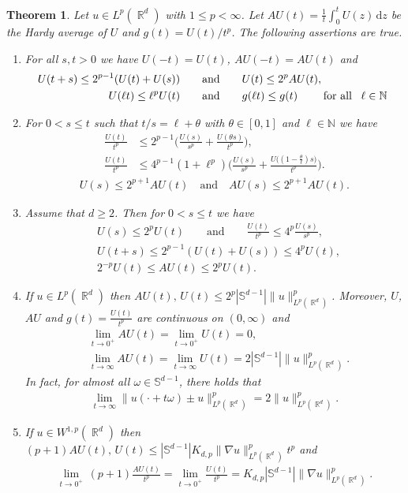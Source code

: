 \documentclass[12pt, reqno]{amsart}%
\theoremstyle{plain}  %
\newtheorem{theorem}{Theorem}[section]
\theoremstyle{definition}  %
\theoremstyle{remark}
\numberwithin{equation}{section}
\DeclareMathOperator{\R}{\mathbb{R}}
\renewcommand{\d}{\,\mathrm{d}}
\begin{document}
\begin{theorem}\label{thm:lp-first-order-diff}
Let $u\in L^p(\R^d)$ with $1\leq p<\infty$. Let  $AU(t)=\frac{1}{t}\int_0^t U(z)\d z$  be the  Hardy average of $U$ and $g(t)= U(t)/t^p$.
The following assertions are true.
\begin{enumerate}
\item \label{itme:lp-diff1}   For all $s, t>0$ we have $U(-t)=U(t)$, $AU(-t)= AU(t)$ and
\begin{align*}
U(t+s)\leq2^{p-1} ( U(t)+U(s))&\qquad\text{and}\qquad U(t)\leq 2^p AU(t), \\
U(\ell t) \leq \ell^pU(t)&\qquad \text{and} \qquad g(\ell t) \leq g(t)\qquad\text{ for all \, $\ell\in \mathbb{N}$ }
\end{align*}
\item  \label{itme:lp-diff2} For $0<s\leq t$ such that $t/s= \ell +\theta$ with $\theta\in [0,1]$ and $\ell \in \mathbb{N}$ we have
\begin{align*}
\frac{U(t)}{t^p}&\leq 2^{p-1}\Big(\frac{U(s)}{s^p}+ \frac{U(\theta s)}{t^p}\Big), \\
\frac{U(t)}{t^p}&\leq 4^{p-1}(1+\ell^p)\Big(\frac{U(s)}{s^p}+  \frac{U\big((1-\tfrac{\theta }{\ell})s\big) }{t^p}\Big).%
\end{align*}
\begin{align*}
U(s)\leq 2^{p+1}AU(t)\quad\text{and}\quad
AU(s)\leq 2^{p+1}AU(t).
\end{align*}
\item \label{itme:lp-diff2-bis}  Assume that  $d\geq 2$. Then for $0<s\leq t$ we have
\begin{align*}
&U(s)\leq 2^pU(t)\qquad \text{and}\qquad  \frac{U(t)}{t^p}\leq 4^{p}\frac{U(s)}{s^p},\\
&U(t+s)\leq 2^{p-1}(U(t)+U(s))\leq 4^p U(t),\\
&2^{-p} U(t)\leq AU(t)\leq 2^p U(t).
\end{align*}
\item  \label{itme:lp-diff3} If $u\in L^p(\R^d)$ then $AU(t),\,U(t)\leq 2^p |\mathbb{S}^{d-1}| \|u\|^p_{L^p(\R^d)}$. Moreover,  $U$, $AU$ and $ g(t)=\frac{U(t)}{t^p}$ are continuous on $(0,\infty)$ and
\begin{align*}
&\lim_{t \to 0^+} AU(t)=\lim_{t \to 0^+} U(t)=0,\\
& \lim_{t \to \infty} AU(t)=\lim_{t \to \infty} U(t)=2|\mathbb{S}^{d-1}|\|u\|^p_{L^p(\R^d)}.
\end{align*}
In fact, for almost all $\omega\in \mathbb{S}^{d-1}$, there holds that
\begin{align*}
\lim_{t \to \infty} \|u(\cdot+ t\omega)\pm u\|^p_{L^p(\R^d)}=2\|u\|^p_{L^p(\R^d)}.
\end{align*}
\item  \label{itme:lp-diff4} If $u\in W^{1,p}(\R^d)$ then $(p+1)AU(t),\, U(t)\leq |\mathbb{S}^{d-1}| K_{d,p}\|\nabla u\|^p_{L^p(\R^d)}t^p $ and
\begin{align*}
 \lim_{t \to 0^+} \, (p+1)\frac{AU(t)}{t^p}=\lim_{t \to 0^+} \frac{U(t)}{t^p}=K_{d,p}|\mathbb{S}^{d-1}|\|\nabla u\|^p_{L^p(\R^d)}.
\end{align*}
\end{enumerate}
\end{theorem}
\end{document}
